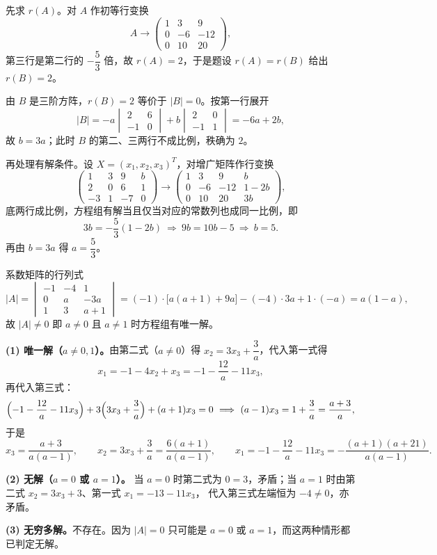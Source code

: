 \begin{solution}
先求 $r(A)$。对 $A$ 作初等行变换
\[
A\to\begin{pmatrix}1&3&9\\0&-6&-12\\0&10&20\end{pmatrix},
\]
第三行是第二行的 $-\dfrac53$ 倍，故 $r(A)=2$，于是题设 $r(A)=r(B)$ 给出 $r(B)=2$。

由 $B$ 是三阶方阵，$r(B)=2$ 等价于 $|B|=0$。按第一行展开
\[
|B|=-a\begin{vmatrix}2&6\\-1&0\end{vmatrix}+b\begin{vmatrix}2&0\\-1&1\end{vmatrix}=-6a+2b,
\]
故 $b=3a$；此时 $B$ 的第二、三两行不成比例，秩确为 $2$。

再处理有解条件。设 $X=(x_1,x_2,x_3)^{T}$，对增广矩阵作行变换
\[
\begin{pmatrix}1&3&9&b\\2&0&6&1\\-3&1&-7&0\end{pmatrix}
\to\begin{pmatrix}1&3&9&b\\0&-6&-12&1-2b\\0&10&20&3b\end{pmatrix},
\]
底两行成比例，方程组有解当且仅当对应的常数列也成同一比例，即
\[
3b=-\frac53(1-2b)\ \Longrightarrow\ 9b=10b-5\ \Longrightarrow\ b=5 .
\]
再由 $b=3a$ 得 $a=\dfrac53$。
\end{solution}

\begin{solution}
系数矩阵的行列式
\[
|A|=\begin{vmatrix}-1&-4&1\\0&a&-3a\\1&3&a+1\end{vmatrix}
=(-1)\cdot\bigl[a(a+1)+9a\bigr]-(-4)\cdot 3a+1\cdot(-a)=a(1-a),
\]
故 $|A|\ne0$ 即 $a\ne0$ 且 $a\ne1$ 时方程组有唯一解。

\textbf{(1) 唯一解（$a\ne0,1$）。}由第二式（$a\ne0$）得 $x_2=3x_3+\dfrac3a$，代入第一式得
\[
x_1=-1-4x_2+x_3=-1-\frac{12}{a}-11x_3,
\]
再代入第三式：
\[
\Bigl(-1-\frac{12}{a}-11x_3\Bigr)+3\Bigl(3x_3+\frac3a\Bigr)+(a+1)x_3=0
\ \Longrightarrow\ (a-1)x_3=1+\frac3a=\frac{a+3}{a},
\]
于是
\[
x_3=\frac{a+3}{a(a-1)},\qquad
x_2=3x_3+\frac3a=\frac{6(a+1)}{a(a-1)},\qquad
x_1=-1-\frac{12}{a}-11x_3=-\frac{(a+1)(a+21)}{a(a-1)}.
\]

\textbf{(2) 无解（$a=0$ 或 $a=1$）。}
当 $a=0$ 时第二式为 $0=3$，矛盾；当 $a=1$ 时由第二式 $x_2=3x_3+3$、第一式 $x_1=-13-11x_3$，
代入第三式左端恒为 $-4\ne0$，亦矛盾。

\textbf{(3) 无穷多解。}不存在。因为 $|A|=0$ 只可能是 $a=0$ 或 $a=1$，而这两种情形都已判定无解。
\end{solution}

